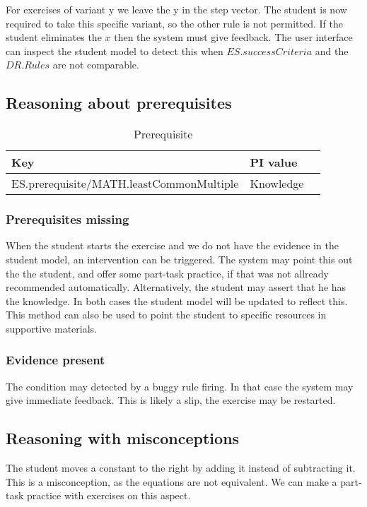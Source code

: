 For exercises of variant y we leave the y in the step vector.
The student is now required to take this specific variant, so the other rule is not permitted.
If the student eliminates the $x$ then the system must give feedback.
The user interface can inspect the student model to detect this when $\mathit{ES.successCriteria}$ and the $\mathit{DR.Rules}$ are not comparable.


\subsection{Reasoning about prerequisites}
\label{sec:preqsts}

\begin{table}[H]
\begin{tabular}{| l | l | l |}
\hline
Key & PI value\\
\hline
ES.prerequisite/MATH.leastCommonMultiple & Knowledge\\
\hline
\end{tabular}
\caption{Prerequisite}
\label{preq.step}
\end{table}

\subsubsection{Prerequisites missing}
When the student starts the exercise and we do not have the evidence in the student model, an intervention can be triggered.
The system may point this out the the student, and offer some part-task practice, if that was not allready recommended automatically. 
Alternatively, the student may assert that he has the knowledge. 
In both cases the student model will be updated to reflect this.
This method can also be used to point the student to specific resources in supportive materials.

\subsubsection{Evidence present}

The condition may detected by a buggy rule firing.
In that case the system may give immediate feedback.
This is likely a slip, the exercise may be restarted.

\subsection{Reasoning with misconceptions}

The student moves a constant to the right by adding it instead of subtracting it.
This is a misconception, as the equations are not equivalent.
We can make a part-task practice with exercises on this aspect.

